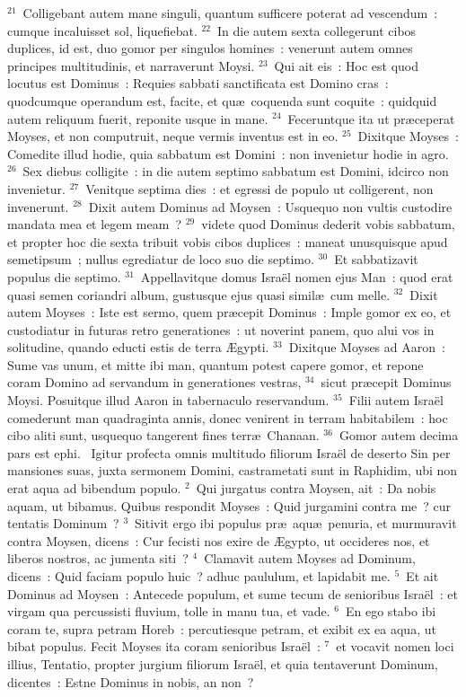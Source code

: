 ${}^{21}$~Colligebant autem mane singuli, quantum sufficere poterat ad vescendum~: cumque incaluisset sol, liquefiebat.
${}^{22}$~In die autem sexta collegerunt cibos duplices, id est, duo gomor per singulos homines~: venerunt autem omnes principes multitudinis, et narraverunt Moysi.
${}^{23}$~Qui ait eis~: Hoc est quod locutus est Dominus~: Requies sabbati sanctificata est Domino cras~: quodcumque operandum est, facite, et qu\ae\ coquenda sunt coquite~: quidquid autem reliquum fuerit, reponite usque in mane.
${}^{24}$~Feceruntque ita ut pr\ae ceperat Moyses, et non computruit, neque vermis inventus est in eo.
${}^{25}$~Dixitque Moyses~: Comedite illud hodie, quia sabbatum est Domini~: non invenietur hodie in agro.
${}^{26}$~Sex diebus colligite~: in die autem septimo sabbatum est Domini, idcirco non invenietur.
${}^{27}$~Venitque septima dies~: et egressi de populo ut colligerent, non invenerunt.
${}^{28}$~Dixit autem Dominus ad Moysen~: Usquequo non vultis custodire mandata mea et legem meam~?
${}^{29}$~videte quod Dominus dederit vobis sabbatum, et propter hoc die sexta tribuit vobis cibos duplices~: maneat unusquisque apud semetipsum~; nullus egrediatur de loco suo die septimo.
${}^{30}$~Et sabbatizavit populus die septimo.
${}^{31}$~Appellavitque domus Isra\"el nomen ejus Man~: quod erat quasi semen coriandri album, gustusque ejus quasi simil\ae\ cum melle.
${}^{32}$~Dixit autem Moyses~: Iste est sermo, quem pr\ae cepit Dominus~: Imple gomor ex eo, et custodiatur in futuras retro generationes~: ut noverint panem, quo alui vos in solitudine, quando educti estis de terra \AE gypti.
${}^{33}$~Dixitque Moyses ad Aaron~: Sume vas unum, et mitte ibi man, quantum potest capere gomor, et repone coram Domino ad servandum in generationes vestras,
${}^{34}$~sicut pr\ae cepit Dominus Moysi. Posuitque illud Aaron in tabernaculo reservandum.
${}^{35}$~Filii autem Isra\"el comederunt man quadraginta annis, donec venirent in terram habitabilem~: hoc cibo aliti sunt, usquequo tangerent fines terr\ae\ Chanaan.
${}^{36}$~Gomor autem decima pars est ephi.
~Igitur profecta omnis multitudo filiorum Isra\"el de deserto Sin per mansiones suas, juxta sermonem Domini, castrametati sunt in Raphidim, ubi non erat aqua ad bibendum populo.
${}^{2}$~Qui jurgatus contra Moysen, ait~: Da nobis aquam, ut bibamus. Quibus respondit Moyses~: Quid jurgamini contra me~? cur tentatis Dominum~?
${}^{3}$~Sitivit ergo ibi populus pr\ae\ aqu\ae\ penuria, et murmuravit contra Moysen, dicens~: Cur fecisti nos exire de \AE gypto, ut occideres nos, et liberos nostros, ac jumenta siti~?
${}^{4}$~Clamavit autem Moyses ad Dominum, dicens~: Quid faciam populo huic~? adhuc paululum, et lapidabit me.
${}^{5}$~Et ait Dominus ad Moysen~: Antecede populum, et sume tecum de senioribus Isra\"el~: et virgam qua percussisti fluvium, tolle in manu tua, et vade.
${}^{6}$~En ego stabo ibi coram te, supra petram Horeb~: percutiesque petram, et exibit ex ea aqua, ut bibat populus. Fecit Moyses ita coram senioribus Isra\"el~:
${}^{7}$~et vocavit nomen loci illius, Tentatio, propter jurgium filiorum Isra\"el, et quia tentaverunt Dominum, dicentes~: Estne Dominus in nobis, an non~?


